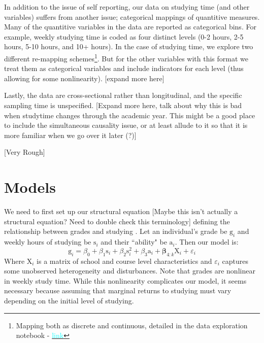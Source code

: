 \documentclass[12pt]{article}
\begin{document}
In addition to the issue of self reporting, our data on studying time (and other variables) suffers from another issue; categorical mappings of quantitive measures. Many of the quantitive variables in the data are reported as categorical bins. For example, weekly studying time is coded as four distinct levels (0-2 hours, 2-5 hours, 5-10 hours, and 10+ hours). In the case of studying time, we explore two different re-mapping schemes\footnote{Mapping both as discrete and continuous, detailed in the data exploration notebook - \href{https://github.com/nadavtadelis/Reproducible_Metrics/blob/master/data_exploration.ipynb}{\textcolor{cyan}{link}}}. But for the other variables with this format we treat them as categorical variables and include indicators for each level (thus allowing for some nonlinearity). \textcolor{BrickRed}{[expand more here]}

Lastly, the data are cross-sectional rather than longitudinal, and the specific sampling time is unspecified. \textcolor{BrickRed}{[Expand more here, talk about why this is bad when studytime changes through the academic year. This might be a good place to include the simultaneous causality issue, or at least allude to it so that it is more familiar when we go over it later (?)]}

\textcolor{BrickRed}{[Very Rough]}


\newpage
\section{Models}
We need to first set up our structural equation \textcolor{BrickRed}{[Maybe this isn't actually a structural equation? Need to double check this terminology]} defining the relationship between grades and studying \citep{CardKrueger}. Let an individual's grade be $\mathrm{g}_i$ and weekly hours of studying be $\mathrm{s}_i$ and their ``ability" be $\mathrm{a}_i$. Then our model is:
$$
\mathrm{g}_i = \beta_0 + \beta_1 \mathrm{s}_i + \beta_2 \mathrm{s}_i^2  + \beta_3 \mathrm{a}_i + \boldsymbol{\beta}_{4:k}\mathrm{X}_i + \varepsilon_i
$$
Where X$_i$ is a matrix of school and course level characteristics and $\varepsilon_i$ captures some unobserved heterogeneity and disturbances. Note that grades are nonlinear in weekly study time. While this nonlinearity complicates our model, it seems necessary because assuming that marginal returns to studying must vary depending on the initial level of studying.
\end{document}
